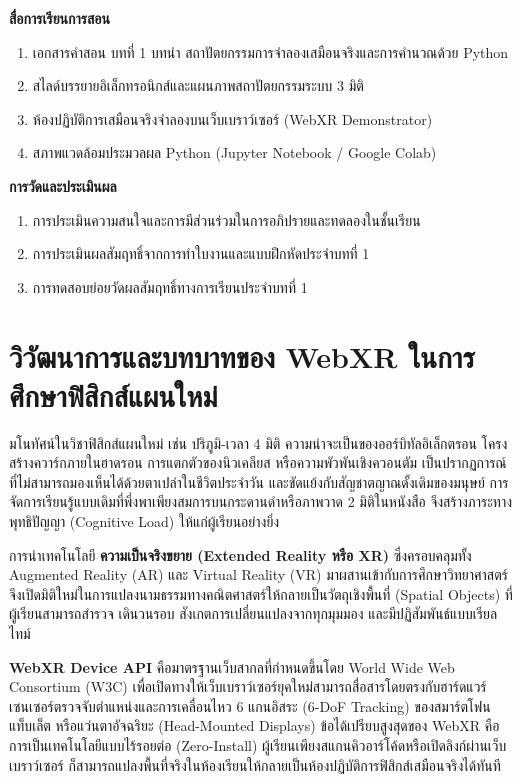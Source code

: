 \begin{lessonplanbox}
\vspace{0.4em}
\noindent\textbf{สื่อการเรียนการสอน}
\begin{enumerate}
    \item เอกสารคำสอน บทที่ 1 บทนำ สถาปัตยกรรมการจำลองเสมือนจริงและการคำนวณด้วย Python
    \item สไลด์บรรยายอิเล็กทรอนิกส์และแผนภาพสถาปัตยกรรมระบบ 3 มิติ
    \item ห้องปฏิบัติการเสมือนจริงจำลองบนเว็บเบราว์เซอร์ (WebXR Demonstrator)
    \item สภาพแวดล้อมประมวลผล Python (Jupyter Notebook / Google Colab)
\end{enumerate}

\vspace{0.4em}
\noindent\textbf{การวัดและประเมินผล}
\begin{enumerate}
    \item การประเมินความสนใจและการมีส่วนร่วมในการอภิปรายและทดลองในชั้นเรียน
    \item การประเมินผลสัมฤทธิ์จากการทำใบงานและแบบฝึกหัดประจำบทที่ 1
    \item การทดสอบย่อยวัดผลสัมฤทธิ์ทางการเรียนประจำบทที่ 1
\end{enumerate}
\end{lessonplanbox}

\section{วิวัฒนาการและบทบาทของ WebXR ในการศึกษาฟิสิกส์แผนใหม่}


มโนทัศน์ในวิชาฟิสิกส์แผนใหม่ เช่น ปริภูมิ-เวลา 4 มิติ ความน่าจะเป็นของออร์บิทัลอิเล็กตรอน โครงสร้างควาร์กภายในฮาดรอน การแตกตัวของนิวเคลียส หรือความพัวพันเชิงควอนตัม เป็นปรากฏการณ์ที่ไม่สามารถมองเห็นได้ด้วยตาเปล่าในชีวิตประจำวัน และขัดแย้งกับสัญชาตญาณดั้งเดิมของมนุษย์ การจัดการเรียนรู้แบบเดิมที่พึ่งพาเพียงสมการบนกระดานดำหรือภาพวาด 2 มิติในหนังสือ จึงสร้างภาระทางพุทธิปัญญา (Cognitive Load) ให้แก่ผู้เรียนอย่างยิ่ง

การนำเทคโนโลยี \textbf{ความเป็นจริงขยาย (Extended Reality หรือ XR)} ซึ่งครอบคลุมทั้ง Augmented Reality (AR) และ Virtual Reality (VR) มาผสานเข้ากับการศึกษาวิทยาศาสตร์ จึงเปิดมิติใหม่ในการแปลงนามธรรมทางคณิตศาสตร์ให้กลายเป็นวัตถุเชิงพื้นที่ (Spatial Objects) ที่ผู้เรียนสามารถสำรวจ เดินวนรอบ สังเกตการเปลี่ยนแปลงจากทุกมุมมอง และมีปฏิสัมพันธ์แบบเรียลไทม์

\textbf{WebXR Device API} คือมาตรฐานเว็บสากลที่กำหนดขึ้นโดย World Wide Web Consortium (W3C) เพื่อเปิดทางให้เว็บเบราว์เซอร์ยุคใหม่สามารถสื่อสารโดยตรงกับฮาร์ดแวร์เซนเซอร์ตรวจจับตำแหน่งและการเคลื่อนไหว 6 แกนอิสระ (6-DoF Tracking) ของสมาร์ตโฟน แท็บเล็ต หรือแว่นตาอัจฉริยะ (Head-Mounted Displays) ข้อได้เปรียบสูงสุดของ WebXR คือการเป็นเทคโนโลยีแบบไร้รอยต่อ (Zero-Install) ผู้เรียนเพียงสแกนคิวอาร์โค้ดหรือเปิดลิงก์ผ่านเว็บเบราว์เซอร์ ก็สามารถแปลงพื้นที่จริงในห้องเรียนให้กลายเป็นห้องปฏิบัติการฟิสิกส์เสมือนจริงได้ทันที


